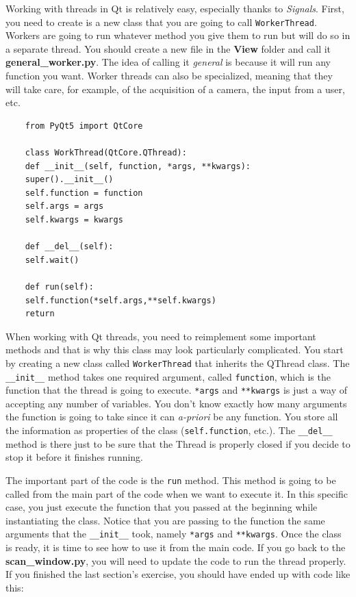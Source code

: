 
Working with threads in Qt is relatively easy, especially thanks to
\emph{Signals}. First, you need to create is a new class that you are
going to call \texttt{WorkerThread}. Workers are going to run whatever
method you give them to run but will do so in a separate thread. You
should create a new file in the \textbf{View} folder and call it
\textbf{general\_worker.py}. The idea of calling it \emph{general} is
because it will run any function you want. Worker threads can also be
specialized, meaning that they will take care, for example, of the
acquisition of a camera, the input from a user, etc.

\begin{verbatim}
    from PyQt5 import QtCore

    class WorkThread(QtCore.QThread):
    def __init__(self, function, *args, **kwargs):
    super().__init__()
    self.function = function
    self.args = args
    self.kwargs = kwargs

    def __del__(self):
    self.wait()

    def run(self):
    self.function(*self.args,**self.kwargs)
    return
\end{verbatim}

When working with Qt threads, you need to reimplement some important
methods and that is why this class may look particularly complicated.
You start by creating a new class called \texttt{WorkerThread} that
inherits the QThread class. The \texttt{__init__} method takes one
required argument, called \texttt{function}, which is the function that
the thread is going to execute. \texttt{*args} and \texttt{**kwargs} is
just a way of accepting any number of variables. You don't know exactly
how many arguments the function is going to take since it can
\emph{a-priori} be any function. You store all the information as
properties of the class (\texttt{self.function}, etc.). The
\texttt{__del__} method is there just to be sure that the Thread is
properly closed if you decide to stop it before it finishes running.

The important part of the code is the \texttt{run} method. This method
is going to be called from the main part of the code when we want to
execute it. In this specific case, you just execute the function that
you passed at the beginning while instantiating the class. Notice that
you are passing to the function the same arguments that the
\texttt{__init__} took, namely \texttt{*args} and \texttt{**kwargs}.
Once the class is ready, it is time to see how to use it from the main
code. If you go back to the \textbf{scan\_window.py}, you will need to
update the code to run the thread properly. If you finished the last
section's exercise, you should have ended up with code like this:


